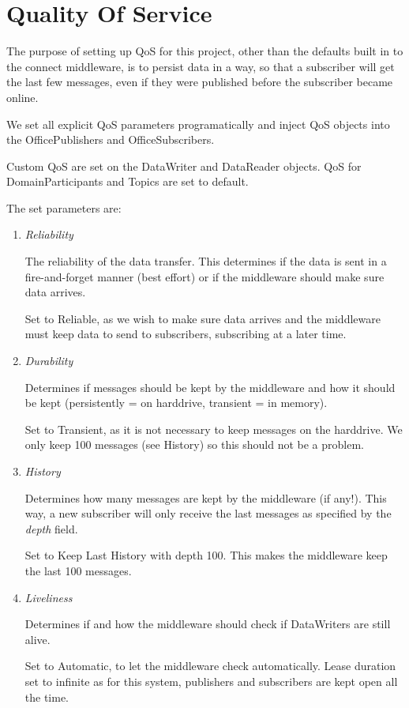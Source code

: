  \begin{center}
\end{center}

\section{Quality Of Service}
The purpose of setting up QoS for this project, other than the defaults built in to the connect middleware, is to persist data in a way, so that a subscriber will get the last few messages, even if they were published before the subscriber became online.

We set all explicit QoS parameters programatically and inject QoS objects into the OfficePublishers and OfficeSubscribers. 

Custom QoS are set on the DataWriter and DataReader objects. QoS for DomainParticipants and Topics are set to default.

The set parameters are:

\begin{enumerate}
\item \textit{Reliability}

The reliability of the data transfer. This determines if the data is sent in a fire-and-forget manner (best effort) or if the middleware should make sure data arrives.

Set to Reliable, as we wish to make sure data arrives and the middleware must keep data to send to subscribers, subscribing at a later time.

\item \textit{Durability}

Determines if messages should be kept by the middleware and how it should be kept (persistently = on harddrive, transient = in memory).

Set to Transient, as it is not necessary to keep messages on the harddrive. We only keep 100 messages (see History) so this should not be a problem.

\item \textit{History}

Determines how many messages are kept by the middleware (if any!). This way, a new subscriber will only receive the last messages as specified by the \textit{depth} field.

Set to Keep Last History with depth 100. This makes the middleware keep the last 100 messages. 

\item \textit{Liveliness}

Determines if and how the middleware should check if DataWriters are still alive. 

Set to Automatic, to let the middleware check automatically. Lease duration set to infinite as for this system, publishers and subscribers are kept open all the time.

\end{enumerate}

